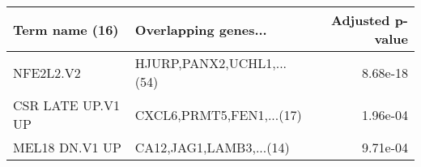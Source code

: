 \begin{tabular}{llr}
\toprule
   Term name (16) &      Overlapping genes... &  Adjusted p-value \\
\midrule
        NFE2L2.V2 & HJURP,PANX2,UCHL1,...(54) &          8.68e-18 \\
CSR LATE UP.V1 UP &  CXCL6,PRMT5,FEN1,...(17) &          1.96e-04 \\
   MEL18 DN.V1 UP &   CA12,JAG1,LAMB3,...(14) &          9.71e-04 \\
\bottomrule
\end{tabular}
